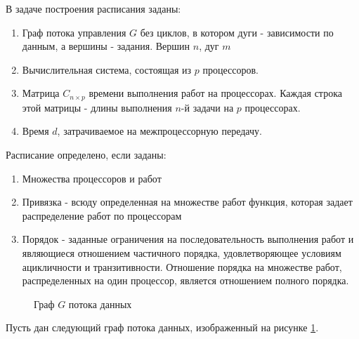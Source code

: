 В задаче построения расписания заданы:
\begin{enumerate}
    \item Граф потока управления $G$ без циклов, в котором дуги - зависимости по данным, а вершины - задания. Вершин $n$, дуг $m$
    \item Вычислительная система, состоящая из $p$ процессоров.
    \item Матрица $C_{n \times p}$ времени выполнения работ на процессорах. Каждая строка этой матрицы - длины выполнения $n$-й задачи на $p$ процессорах.
    \item Время $d$, затрачиваемое на межпроцессорную передачу.
\end{enumerate}

Расписание определено, если заданы:
\begin{enumerate}
    \item Множества процессоров и работ
    \item Привязка - всюду определенная на множестве работ функция, которая задает распределение работ по процессорам
    \item Порядок - заданные ограничения на последовательность выполнения работ и являющиеся отношением частичного порядка, удовлетворяющее условиям ацикличности и транзитивности. Отношение порядка на множестве работ, распределенных на один процессор, является отношением полного порядка.
\end{enumerate}

\begin{figure}[!htbp]
    \caption{Граф $G$ потока данных}
    \label{fig:DFG}
\end{figure}
Пусть дан следующий граф потока данных, изображенный на рисунке \ref{fig:DFG}.

